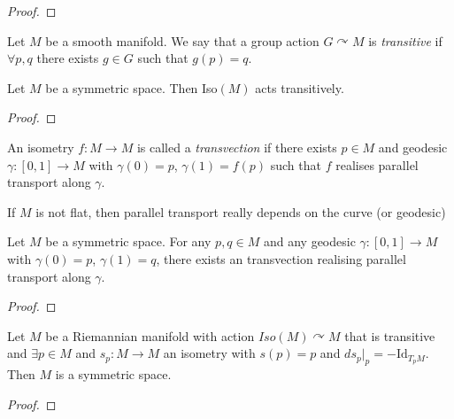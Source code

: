 \documentclass[10pt,a4paper]{article}
\begin{document}
\begin{proof}

\end{proof}

\begin{defn}
Let $M$ be a smooth manifold. We say that a group action $G\curvearrowright M$ is \textit{transitive} if $ \forall p,q$ there exists $g\in G$ such that $g(p)=q$.
\end{defn}

\begin{prop}
Let $M$ be a symmetric space. Then Iso$(M)$ acts transitively.
\end{prop}
\begin{proof}

\end{proof}

\begin{defn}
An isometry $f:M\to M$ is called a \textit{transvection} if there exists $p\in M$ and geodesic $\gamma:[0,1]\to M$ with $\gamma(0) = p$, $\gamma(1)=f(p)$ such that $f$ realises parallel transport along $\gamma$.
\end{defn}

\begin{remark}
If $M$ is not flat, then parallel transport really depends on the curve (or geodesic)
\end{remark}

\begin{prop}
Let $M$ be a symmetric space. For any $p,q\in M$ and any geodesic $\gamma:[0,1]\to M$ with $\gamma(0)= p$, $\gamma(1)=q$, there exists an transvection realising parallel transport along $\gamma$.
\end{prop}
\begin{proof}

\end{proof}

\begin{prop}
Let $M$ be a Riemannian manifold with action $Iso(M)\curvearrowright M$ that is transitive and $\exists p\in M$ and $s_p:M\to M$ an isometry with $s(p)=p$ and $ds_p\vert_p = -\text{Id}_{T_pM}$. Then $M$ is a symmetric space.
\end{prop}
\begin{proof}

\end{proof}
\end{document}
